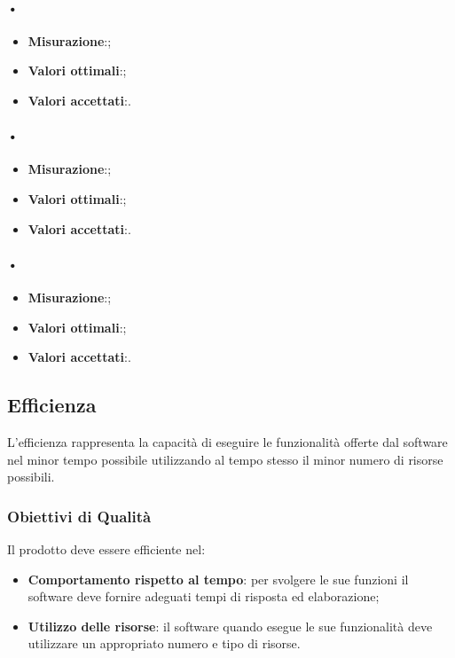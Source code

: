 \paragraph{•}
\begin{itemize}
\item \textbf{Misurazione}:;
\item \textbf{Valori ottimali}:;
\item \textbf{Valori accettati}:.
\end{itemize}

\paragraph{•}
\begin{itemize}
\item \textbf{Misurazione}:;
\item \textbf{Valori ottimali}:;
\item \textbf{Valori accettati}:.
\end{itemize}

\paragraph{•}
\begin{itemize}
\item \textbf{Misurazione}:;
\item \textbf{Valori ottimali}:;
\item \textbf{Valori accettati}:.
\end{itemize}

\subsection{Efficienza}
L’efficienza rappresenta la capacità di eseguire le funzionalità offerte dal software nel minor tempo possibile utilizzando al tempo stesso il minor numero di risorse possibili.

\subsubsection{Obiettivi di Qualità}
Il prodotto deve essere efficiente nel:
\begin{itemize}
\item \textbf{Comportamento rispetto al tempo}: per svolgere le sue funzioni il software deve fornire adeguati tempi di risposta ed elaborazione;
\item \textbf{Utilizzo delle risorse}: il software quando esegue le sue funzionalità deve utilizzare un appropriato numero e tipo di risorse.
\end{itemize}

